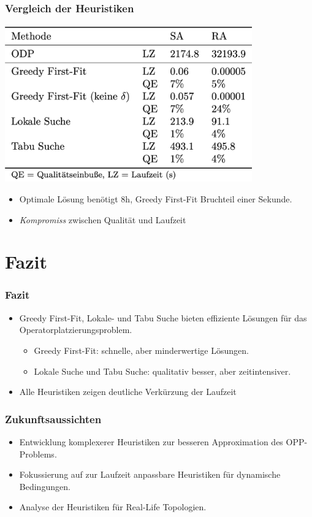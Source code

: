 \documentclass{beamer}
\begin{document}
\begin{frame}
\frametitle{Vergleich der Heuristiken}

\begin{center}
    \includegraphics[width=0.8\textwidth]{res/evaluation.png} 
\end{center}

\begin{itemize}
    \item Optimale Lösung benötigt 8h, Greedy First-Fit Bruchteil einer Sekunde.
    \item  \textit{Kompromiss} zwischen Qualität und Laufzeit
\end{itemize}
\end{frame}

\section{Fazit}
\begin{frame}
\frametitle{Fazit}
\begin{itemize}
    \item Greedy First-Fit, Lokale- und Tabu Suche bieten effiziente Lösungen für das Operatorplatzierungsproblem.
    \begin{itemize}
        \item Greedy First-Fit: schnelle, aber minderwertige Lösungen.
        \item Lokale Suche und Tabu Suche: qualitativ besser, aber zeitintensiver.
    \end{itemize}
    \item Alle Heuristiken zeigen deutliche Verkürzung der Laufzeit
\end{itemize}
\end{frame}

\begin{frame}
\frametitle{Zukunftsaussichten}
\begin{itemize}
    \item Entwicklung komplexerer Heuristiken zur besseren Approximation des OPP-Problems.
    \item Fokussierung auf zur Laufzeit anpassbare Heuristiken für dynamische Bedingungen.
    \item Analyse der Heuristiken für Real-Life Topologien.
\end{itemize}
\end{frame}
\end{document}
